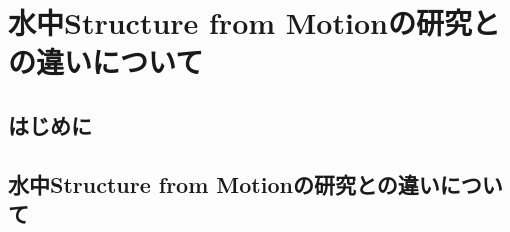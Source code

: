 \chapter{水中Structure from Motionの研究との違いについて}
\setcounter{page}{1}
\renewcommand{\thepage}{B--\arabic{page}}

\thispagestyle{empty}

\newpage
\section{はじめに}




\newpage

\section{水中Structure from Motionの研究との違いについて}


\newpage


